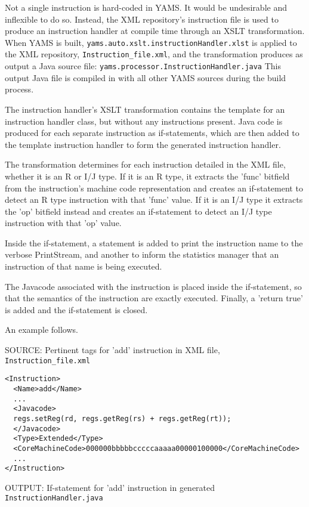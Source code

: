 Not a single instruction is hard-coded in YAMS. It would be undesirable and inflexible to do so. Instead, the XML repository's instruction file is used to produce an instruction handler at compile time through an XSLT transformation.
When YAMS is built, \verb"yams.auto.xslt.instructionHandler.xlst" is applied to the XML repository, \verb'Instruction_file.xml', and the transformation produces as output a Java source file: \verb'yams.processor.InstructionHandler.java'
This output Java file is compiled in with all other YAMS sources during the build process.

The instruction handler's XSLT transformation contains the template for an instruction handler class, but without any instructions present. Java code is produced for each separate instruction as if-statements, which are then added to the template instruction handler to form the generated instruction handler. 

The transformation determines for each instruction detailed in the XML file, whether it is an R or I/J type. If it is an R type, it extracts the 'func' bitfield from the instruction's machine code representation and creates an if-statement to detect an R type instruction with that 'func' value. 
If it is an I/J type it extracts the 'op' bitfield instead and creates an if-statement to detect an I/J type instruction with that 'op' value.

Inside the if-statement, a statement is added to print the instruction name to the verbose PrintStream, and another to inform the statistics manager that an instruction of that name is being executed. 

The Javacode associated with the instruction is placed inside the if-statement, so that the semantics of the instruction are exactly executed. Finally, a 'return true' is added and the if-statement is closed.

An example follows. 

SOURCE:  Pertinent tags for 'add' instruction in XML file, \verb"Instruction_file.xml"

\begin{verbatim}
<Instruction>
  <Name>add</Name>
  ...
  <Javacode>
  regs.setReg(rd, regs.getReg(rs) + regs.getReg(rt));
  </Javacode>
  <Type>Extended</Type>
  <CoreMachineCode>000000bbbbbcccccaaaaa00000100000</CoreMachineCode>
  ...
</Instruction>
\end{verbatim}

OUTPUT:  If-statement for 'add' instruction in generated \verb"InstructionHandler.java"

